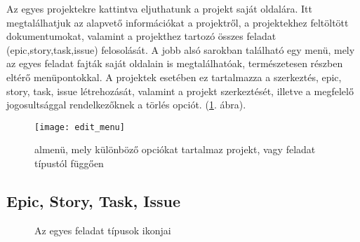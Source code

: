Az egyes projektekre kattintva eljuthatunk a projekt saját oldalára. Itt megtalálhatjuk az alapvető információkat a projektről, a projektekhez feltöltött dokumentumokat, valamint a projekthez tartozó összes feladat (epic,story,task,issue) felosolását. A jobb alsó sarokban található egy menü, mely az egyes feladat fajták saját oldalain is megtalálhatóak, természetesen részben eltérő menüpontokkal. A projektek esetében ez tartalmazza a szerkeztés, epic, story, task, issue létrehozását, valamint a projekt szerkeztését, illetve a megfelelő jogosultsággal rendelkezőknek a törlés opciót. (\ref{fig:example-4}. ábra).

\begin{figure}[H]
	\centering
	\texttt{[image: edit\_menu]}
	\caption{almenü, mely különböző opciókat tartalmaz projekt, vagy feladat típustól függően}
	\label{fig:example-4}
\end{figure}

\subsection{Epic, Story, Task, Issue}
\label{stories}

\begin{figure}[H]
	\centering
	\hspace{35pt}
	\hspace{35pt}
	\hspace{35pt}
	\caption{Az egyes feladat típusok ikonjai}
	\label{fig:example-5}
\end{figure}



